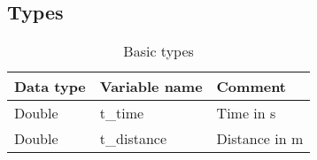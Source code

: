 \documentclass{template/openetcs_article}
\begin{document}
\subsection{Types}
\begin{longtable}{|l|l|l|}
	\caption{Basic types}\\ 
	\hline
		\begin{minipage}[t]{0.20\linewidth} \textbf{Data type}	\end{minipage}
	&	\begin{minipage}[t]{0.20\linewidth} \textbf{Variable name}	\end{minipage} 
	&	\begin{minipage}[t]{0.65\linewidth} \textbf{Comment} \end{minipage} \\
	\hline
		\begin{minipage}[t]{0.20\linewidth} Double	\end{minipage} 
	&	\begin{minipage}[t]{0.20\linewidth} t\_time 	\end{minipage} 
	&	\begin{minipage}[t]{0.65\linewidth} Time in s 	\end{minipage} \\
	\hline
		\begin{minipage}[t]{0.20\linewidth} Double	\end{minipage} 
	&	\begin{minipage}[t]{0.20\linewidth} t\_distance		\end{minipage} 
	&	\begin{minipage}[t]{0.65\linewidth} Distance in m 	\end{minipage} \\
	\hline
\end{longtable}	
\newpage
\end{document}
